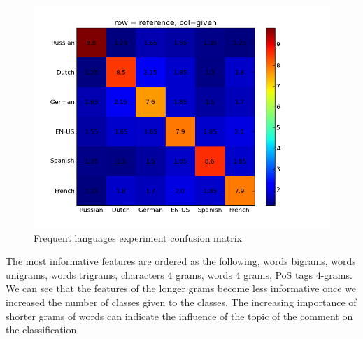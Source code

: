 \documentclass[11pt]{article}
\begin{document}
\begin{figure}[htp]
\centering
\includegraphics[scale=0.45]{popular_cfm.png}
\caption{Frequent languages experiment confusion matrix}
\label{pop_cfm}
\end{figure}

The most informative features are ordered as the following, words bigrams, words unigrams, words trigrams, characters 4 grams, words 4 grams, PoS tags 4-grams. We can see that the features of the longer grams become less informative once we increased the number of classes given to the classes. The increasing importance of shorter grams of words can indicate the influence of the topic of the comment on the classification.
\end{document}
